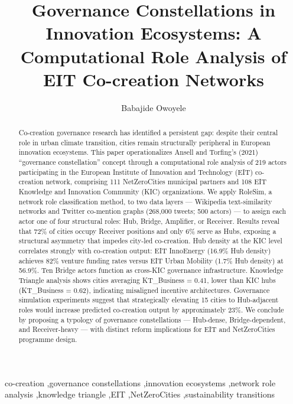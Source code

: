 \documentclass[review,12pt]{elsarticle}
\begin{document}
\begin{frontmatter}

\title{Governance Constellations in Innovation Ecosystems: A Computational Role Analysis of EIT Co-creation Networks}

\author[rsm]{Babajide Owoyele}
\address[rsm]{Rotterdam School of Management, Erasmus University, Burgemeester Oudlaan 50, 3062 PA Rotterdam, The Netherlands}

\begin{abstract}
Co-creation governance research has identified a persistent gap: despite their central role in urban climate transition, cities remain structurally peripheral in European innovation ecosystems. This paper operationalizes Ansell and Torfing's (2021) ``governance constellation'' concept through a computational role analysis of 219 actors participating in the European Institute of Innovation and Technology (EIT) co-creation network, comprising 111 NetZeroCities municipal partners and 108 EIT Knowledge and Innovation Community (KIC) organizations. We apply RoleSim, a network role classification method, to two data layers --- Wikipedia text-similarity networks and Twitter co-mention graphs (268,000 tweets; 500 actors) --- to assign each actor one of four structural roles: Hub, Bridge, Amplifier, or Receiver. Results reveal that 72\% of cities occupy Receiver positions and only 6\% serve as Hubs, exposing a structural asymmetry that impedes city-led co-creation. Hub density at the KIC level correlates strongly with co-creation output: EIT InnoEnergy (16.9\% Hub density) achieves 82\% venture funding rates versus EIT Urban Mobility (1.7\% Hub density) at 56.9\%. Ten Bridge actors function as cross-KIC governance infrastructure. Knowledge Triangle analysis shows cities averaging KT\_Business = 0.41, lower than KIC hubs (KT\_Business = 0.62), indicating misaligned incentive architectures. Governance simulation experiments suggest that strategically elevating 15 cities to Hub-adjacent roles would increase predicted co-creation output by approximately 23\%. We conclude by proposing a typology of governance constellations --- Hub-dense, Bridge-dependent, and Receiver-heavy --- with distinct reform implications for EIT and NetZeroCities programme design.
\end{abstract}

\begin{keyword}
co-creation \sep governance constellations \sep innovation ecosystems \sep network role analysis \sep knowledge triangle \sep EIT \sep NetZeroCities \sep sustainability transitions
\end{keyword}


\end{frontmatter}
\end{document}
